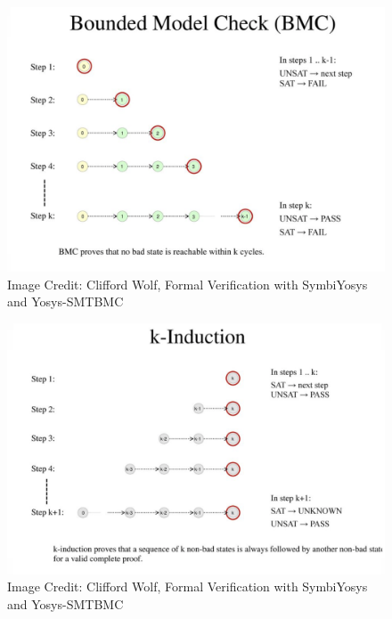 \documentclass{beamer}
\begin{document}
\begin{frame}
  \begin{figure}[h]
    \includegraphics[width=\textwidth]{formal_3}
    \scriptsize Image Credit: Clifford Wolf, Formal Verification with SymbiYosys and Yosys-SMTBMC
  \end{figure}
\end{frame}

\begin{frame}
  \begin{figure}[h]
    \includegraphics[width=\textwidth]{formal_4}
    \scriptsize Image Credit: Clifford Wolf, Formal Verification with SymbiYosys and Yosys-SMTBMC
  \end{figure}
\end{frame}
\end{document}
